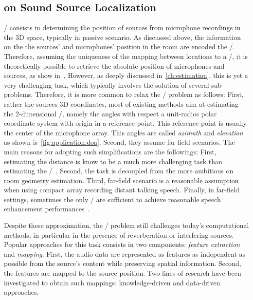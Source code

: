 \subsection{on Sound Source Localization}
\SSLdef/ consists in determining the position of sources from microphone recordings in the 3D space, typically in passive scenario.
As discussed above, the information on the the sources' and microphones' position in the room are encoded the \RIRs/.
Therefore, assuming the uniqueness of the mapping between locations to a \RIR/, it is theoretically possible to retrieve the absolute position of microphones and sources, as show in~.
However, as deeply discussed in~\cref{ch:estimation}, this is yet a very challenging task, which typically involves the solution of several sub-problems.
Therefore, it is more common to relax the \SSL/ problem as follows:
First, rather the sources 3D coordinates, most of existing methods aim at estimating the 2-dimensional \DOAdef/, namely the angles with respect a unit-radios polar coordinate system with origin in a reference point.
This reference point is usually the center of the microphone array.
This angles are called \textit{azimuth} and \textit{elevation} as shown is~\cref{fig:application:doa}.
Second, they assume far-field scenarios.
The main reasons for adopting such simplifications are the followings:
First, estimating the distance is know to be a much more challenging task than estimating the \DOAs/~.
Second, the task is decoupled from the more ambitious on room geometry estimation.
Third, far-field scenario is a reasonable assumption when using compact array recording distant talking speech.
Finally, in far-field settings, sometimes the only \DOAs/ are sufficient to achieve reasonable speech enhancement performances~.


\mynewline
Despite these approximation, the \SSL/ problem still challenges today's computational methods, in particular in the presence of reverberation or interfering sources.
Popular approaches for this task consists in two components: \textit{feature extraction} and \textit{mapping}.
First, the audio data are represented as features as independent as possible from the source's content while preserving spatial information.
Second, the features are mapped to the source position.
Two lines of research have been investigated to obtain such mappings: knowledge-driven and data-driven approaches.

